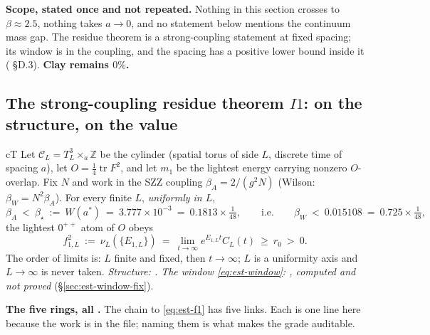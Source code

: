 \noindent\textbf{Scope, stated once and not repeated.} Nothing in this section crosses to
$\beta\approx2.5$, nothing takes $a\to0$, and no statement below mentions the continuum mass gap.
The residue theorem is a strong-coupling statement at fixed spacing; its window is in the coupling,
and the spacing has a positive lower bound inside it (
\S D.3). \textbf{Clay remains $0\%$.}

\subsection{The strong-coupling residue theorem \texorpdfstring{$I1$}{I1}: \texorpdfstring{\LT}{[T]} on the structure, \texorpdfstring{\LC}{[C]} on the value}
\label{sec:est-i1}

\begin{claimbox}{cT}
 Let
$\mathcal C_L=T^3_L\times_a\mathbb Z$ be the cylinder (spatial torus of side $L$, discrete time of
spacing $a$), let $O=\tfrac14\operatorname{tr}F^2$, and let $m_1$ be the lightest energy carrying
nonzero $O$-overlap. Fix $N$ and work in the SZZ coupling $\beta_A=2/(g^2N)$ (Wilson:
$\beta_W=N^2\beta_A$). For every finite $L$, \emph{uniformly in $L$},
\begin{equation}
\beta_A\ <\ \beta_\star\ :=\ W(a^\ast)\ =\ 3.777\times10^{-3}\ =\ 0.1813\times\tfrac1{48},
\qquad\text{i.e.}\qquad
\beta_W\ <\ 0.015108\ =\ 0.725\times\tfrac1{48},
\label{eq:est-window}
\end{equation}
the lightest $0^{++}$ atom of $O$ obeys
\begin{equation}
f^2_{1,L}\ :=\ \nu_L(\{E_{1,L}\})\ =\ \lim_{t\to\infty}e^{E_{1,L}t}C_L(t)\ \ge\ r_0\ >\ 0 .
\label{eq:est-f1}
\end{equation}
The order of limits is: $L$ finite and fixed, then $t\to\infty$; $L$ is a uniformity axis and
$L\to\infty$ is never taken. \emph{Structure: \LT. The window \eqref{eq:est-window}: \LC, computed
and not proved} (\S\ref{sec:est-window-fix}).
\end{claimbox}

\noindent\textbf{The five rings, all \LT.} The chain to \eqref{eq:est-f1} has five links. Each is one
line here because the work is in the file; naming them is what makes the grade auditable.

